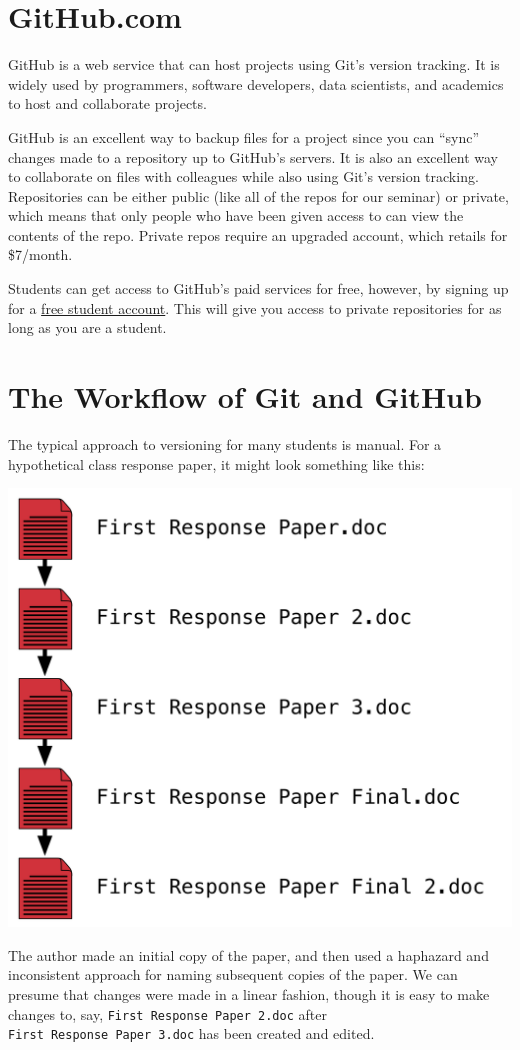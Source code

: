 \documentclass[]{book}
\begin{document}
\section{GitHub.com}\label{github.com}

GitHub is a web service that can host projects using Git's version
tracking. It is widely used by programmers, software developers, data
scientists, and academics to host and collaborate projects.

GitHub is an excellent way to backup files for a project since you can
``sync'' changes made to a repository up to GitHub's servers. It is also
an excellent way to collaborate on files with colleagues while also
using Git's version tracking. Repositories can be either public (like
all of the repos for our seminar) or private, which means that only
people who have been given access to can view the contents of the repo.
Private repos require an upgraded account, which retails for \$7/month.

Students can get access to GitHub's paid services for free, however, by
signing up for a \href{https://education.github.com}{free student
account}. This will give you access to private repositories for as long
as you are a student.

\section{The Workflow of Git and
GitHub}\label{the-workflow-of-git-and-github}

The typical approach to versioning for many students is manual. For a
hypothetical class response paper, it might look something like this:

\includegraphics[width=0.5\linewidth]{images/gitFlow01}

The author made an initial copy of the paper, and then used a haphazard
and inconsistent approach for naming subsequent copies of the paper. We
can presume that changes were made in a linear fashion, though it is
easy to make changes to, say, \texttt{First\ Response\ Paper\ 2.doc}
after \texttt{First\ Response\ Paper\ 3.doc} has been created and
edited.
\end{document}
